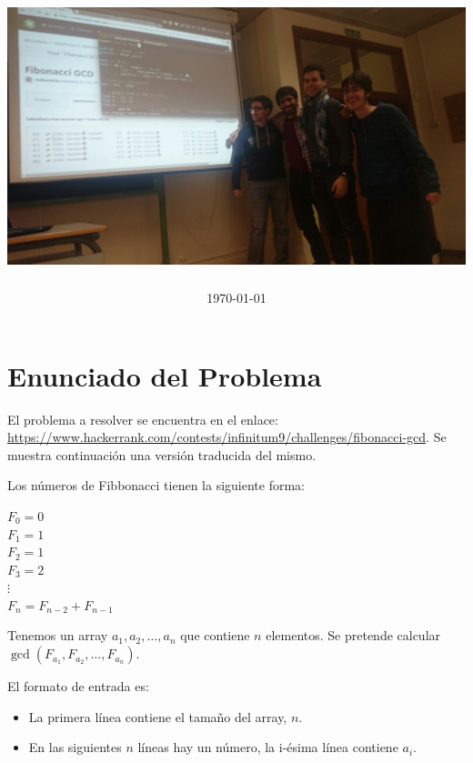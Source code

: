 \documentclass{article}
\title{                                             %
    \textmd{\textbf{\asignatura \\ \titulo}} \\         %
    \vspace{2cm}
    \includegraphics[width=15.5cm]{FibonacciGCD.jpg}    %
    \vspace{1cm}
}
\author{\textbf{\autor}}                            %
\date{\today}                                       %
\theoremstyle{theorem-style}  %
\theoremstyle{definition}
\theoremstyle{example-style}
\begin{document}
\maketitle

\makeatletter\renewcommand{\ALG@name}{Algoritmo}
\renewcommand{\listalgorithmname}{Lista de \ALG@name s} \makeatother



\newpage

\section*{Enunciado del Problema}
    El problema a resolver se encuentra en el enlace: \url{https://www.hackerrank.com/contests/infinitum9/challenges/fibonacci-gcd}. Se muestra  continuación una versión traducida del mismo.
    
    Los números de Fibbonacci tienen la siguiente forma:
    
    \begin{center}
        $F_0 = 0$\\
        $F_1 = 1$\\
        $F_2 = 1$\\
        $F_3 = 2$\\
        $\vdots$\\
        $F_n = F_{n-2} + F_{n-1}$
    \end{center}
    
    Tenemos un array $a_1,a_2,\dots,a_n$ que contiene $n$ elementos. Se pretende calcular $\gcd(F_{a_1},F_{a_2},\dots,F_{a_n})$.
    
    El formato de entrada es:
    \begin{itemize}
        \item La primera línea contiene el tamaño del array, $n$.
        \item En las siguientes $n$ líneas hay un número, la i-ésima línea contiene $a_i$.
    \end{itemize} 
    
\end{document}
